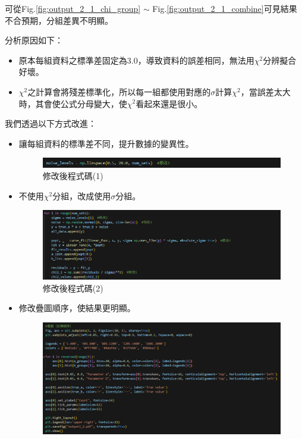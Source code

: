\documentclass[12pt,a4paper]{article}
\begin{document}
\begin{CJK}{UTF8}{bkai}
可從Fig.\ref{fig:output_2_1_chi_group} $\sim$ Fig.\ref{fig:output_2_1_combine}可見結果不合預期，分組差異不明顯。

分析原因如下：
\begin{itemize}
    \item 原本每組資料之標準差固定為3.0，導致資料的誤差相同，無法用$\chi^2$分辨擬合好壞。
    \item $\chi^2$之計算會將殘差標準化，所以每一組都使用對應的$\sigma$計算$\chi^2$，當誤差太大時，其會使公式分母變大，使$\chi^2$看起來還是很小。
\end{itemize}

我們透過以下方式改進：
\begin{itemize}
    \item 讓每組資料的標準差不同，提升數據的變異性。
    \begin{figure}[h]
        \centering
        \includegraphics[width=1\linewidth]{figures/code/practice_2/practice_2_revise.png}
        \caption{修改後程式碼(1)}
        \label{fig:practice_2_revise1}
    \end{figure}
    \item 不使用$\chi^2$分組，改成使用$\sigma$分組。
    \begin{figure}[h]
        \centering
        \includegraphics[width=1\linewidth]{figures/code/practice_2/practice_2_revise2.png}
        \caption{修改後程式碼(2)}
        \label{fig:practice_2_revise2}
    \end{figure}
    \clearpage
    \item 修改疊圖順序，使結果更明顯。
    \begin{figure}[h]
        \centering
        \includegraphics[width=1\linewidth]{figures/code/practice_2/practice_2_revise3.png}

\end{figure}
\end{itemize}
\end{CJK}
\end{document}
